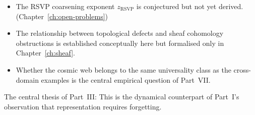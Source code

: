 \begin{tcolorbox}[
  title={\textbf{What Remains Open After This Part}},
  colback=boxorange,colframe=orange!60!black,
  fonttitle=\small\sffamily
]
\begin{itemize}[leftmargin=1.5em,itemsep=2pt]
  \item The RSVP coarsening exponent $z_{\mathrm{RSVP}}$
    is conjectured but not yet derived. (Chapter~\ref{ch:open-problems})
  \item The relationship between topological defects and
    sheaf cohomology obstructions is established conceptually
    here but formalised only in
    Chapter~\ref{ch:sheaf}.
  \item Whether the cosmic web belongs to the same
    universality class as the cross-domain examples is
    the central empirical question of Part~VII\@.
\end{itemize}

The central thesis of Part~III:
This is the dynamical counterpart of Part~I's observation
that representation requires forgetting.
\end{tcolorbox}
